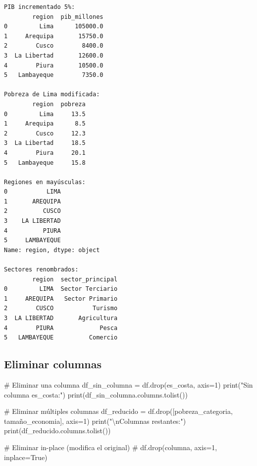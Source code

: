 \documentclass[
  doc,
  floatsintext,
  longtable,
  a4paper,
  nolmodern,
  notxfonts,
  notimes,
  12pt,
  colorlinks=true,linkcolor=blue,citecolor=blue,urlcolor=blue]{apa7}
\newenvironment{Shaded}{\begin{snugshade}}{\end{snugshade}}
\newcommand{\BuiltInTok}[1]{\textcolor[rgb]{0.00,0.23,0.31}{#1}}
\newcommand{\CharTok}[1]{\textcolor[rgb]{0.13,0.47,0.30}{#1}}
\newcommand{\CommentTok}[1]{\textcolor[rgb]{0.37,0.37,0.37}{#1}}
\newcommand{\DecValTok}[1]{\textcolor[rgb]{0.68,0.00,0.00}{#1}}
\newcommand{\NormalTok}[1]{\textcolor[rgb]{0.00,0.23,0.31}{#1}}
\newcommand{\OperatorTok}[1]{\textcolor[rgb]{0.37,0.37,0.37}{#1}}
\newcommand{\StringTok}[1]{\textcolor[rgb]{0.13,0.47,0.30}{#1}}
\begin{document}
\begin{verbatim}
PIB incrementado 5%:
        region  pib_millones
0         Lima      105000.0
1     Arequipa       15750.0
2        Cusco        8400.0
3  La Libertad       12600.0
4        Piura       10500.0
5   Lambayeque        7350.0

Pobreza de Lima modificada:
        region  pobreza
0         Lima     13.5
1     Arequipa      8.5
2        Cusco     12.3
3  La Libertad     18.5
4        Piura     20.1
5   Lambayeque     15.8

Regiones en mayúsculas:
0           LIMA
1       AREQUIPA
2          CUSCO
3    LA LIBERTAD
4          PIURA
5     LAMBAYEQUE
Name: region, dtype: object

Sectores renombrados:
        region  sector_principal
0         LIMA  Sector Terciario
1     AREQUIPA   Sector Primario
2        CUSCO           Turismo
3  LA LIBERTAD       Agricultura
4        PIURA             Pesca
5   LAMBAYEQUE          Comercio
\end{verbatim}

\subsection{Eliminar columnas}\label{eliminar-columnas}

\begin{Shaded}
\begin{Highlighting}[]
\CommentTok{\# Eliminar una columna}
\NormalTok{df\_sin\_columna }\OperatorTok{=}\NormalTok{ df.drop(}\StringTok{\textquotesingle{}es\_costa\textquotesingle{}}\NormalTok{, axis}\OperatorTok{=}\DecValTok{1}\NormalTok{)}
\BuiltInTok{print}\NormalTok{(}\StringTok{"Sin columna \textquotesingle{}es\_costa\textquotesingle{}:"}\NormalTok{)}
\BuiltInTok{print}\NormalTok{(df\_sin\_columna.columns.tolist())}

\CommentTok{\# Eliminar múltiples columnas}
\NormalTok{df\_reducido }\OperatorTok{=}\NormalTok{ df.drop([}\StringTok{\textquotesingle{}pobreza\_categoria\textquotesingle{}}\NormalTok{, }\StringTok{\textquotesingle{}tamaño\_economia\textquotesingle{}}\NormalTok{], axis}\OperatorTok{=}\DecValTok{1}\NormalTok{)}
\BuiltInTok{print}\NormalTok{(}\StringTok{"}\CharTok{\textbackslash{}n}\StringTok{Columnas restantes:"}\NormalTok{)}
\BuiltInTok{print}\NormalTok{(df\_reducido.columns.tolist())}

\CommentTok{\# Eliminar in{-}place (modifica el original)}
\CommentTok{\# df.drop(\textquotesingle{}columna\textquotesingle{}, axis=1, inplace=True)}
\end{Highlighting}
\end{Shaded}
\end{document}
